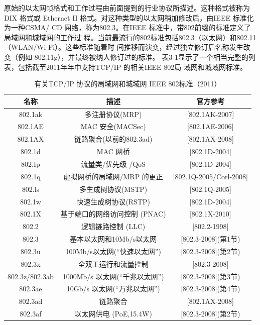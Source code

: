 原始的以太网帧格式和工作过程由前面提到的行业协议所描述。这种格式被称为DIX
格式或 Ethernet II 格式。对这种类型的以太网稍加修改后，由IEEE 标准化为一种CSMA/
CD 网络，称为802.3。在IEEE 标准中，带802前缀的标准定义了局域网和城域网的工作过
程。当前最流行的802标准包括802.3（以太网）和802.11（WLAN/Wi-Fi）。这些标准随着时
间推移而演变，经过独立修订后名称发生改变（例如 802.11g），并最终被纳人修订过的标准。
表3-1显示了一个相当完整的列表，包括截至2011年年中支持TCP/IP 的相关IEEE 802局
域网和城域网标准。

\begin{table}[]
    \centering
    \caption{有关TCP/IP 协议的局域网和城域网 IEEE 802标准（2011）}
    \begin{tabular}{c|c|c}
        \hline
        名称	&	描述	&	官方参考  \\ \hline
        802.1ak	&	多注册协议(MRP)	&	[802.1AK-2007]  \\ \hline
        802.1AE	&	MAC 安全(MACSec)	&	[802.1AE-2006]  \\ \hline
        802.1AX	&	链路聚合(以前的802.3ad)	&	[802.1AX-2008]  \\ \hline
        802.1d	&	MAC 网桥	&	[802.1D-2004]  \\ \hline
        802.Ip	&	流量类/优先级 /QoS	&	[802.1D-2004]  \\ \hline
        802.1q	&	虚拟网桥的局域网/MRP 的更正	&	[802.1Q-2005/Corl-2008]  \\ \hline
        802.ls	&	多生成树协议(MSTP)	&	[802.1Q-2005]  \\ \hline
        802.1w	&	快速生成树协议(RSTP)	&	[802.1D-2004]  \\ \hline
        802.1X	&	基于端口的网络访问控制 (PNAC)	&	[802.1X-2010]  \\ \hline
        802.2	&	逻辑链路控制 (LLC)	&	[802.2-1998]  \\ \hline
        802.3	&	基本以太网和10Mb/s以太网	&	[802.3-2008](第1节)  \\ \hline
        802.3u	&	100Mb/s以太网(“快速以太网”)	&	[802.3-2008](第2节)  \\ \hline
        802.3x	&	全双工运行和流量控制	&	[802.3-2008]  \\ \hline
        802.3z/802.3ab	&	1000Mb/s 以太网(“千兆以太网”)	&	[802.3-2008](第3节)  \\ \hline
        802.3ae	&	10Gb/s 以太网(“万兆以太网”)	&	[802.3-2008](第4节)  \\ \hline
        802.3ad	&	链路聚合	&	[802.1AX-2008]  \\ \hline
        802.3af	&	以太网供电 (PoE,15.4W)	&	[802.3-2008](第2节)  \\ \hline

\end{tabular}
\end{table}
